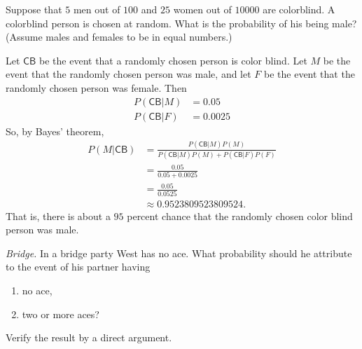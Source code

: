 \begin{problem}[Handout 4, \# 9]
  Suppose that \(5\) men out of \(100\) and \(25\) women out of
  \(\num{10000}\) are colorblind. A colorblind person is chosen at
  random. What is the probability of his being male? (Assume males and
  females to be in equal numbers.)
\end{problem}
\begin{solution}
  Let $\mathsf{\mathsf{CB}}$ be the event that a randomly chosen person is
  color blind. Let $M$ be the event that the randomly chosen person was
  male, and let $F$ be the event that the randomly chosen person was
  female. Then
  \begin{align*}
    P(\mathsf{CB}|M) &= 0.05 \\
    P(\mathsf{CB}|F) &= 0.0025
  \end{align*}
  So, by Bayes' theorem,
  \begin{align*}
    P(M|\mathsf{CB})
    &=\frac{P(\mathsf{CB}|M)P(M)}{P(\mathsf{CB}|M)P(M) + P(\mathsf{CB}|F)P(F)}\\
    &=\frac{0.05}{0.05+0.0025}\\
    &=\frac{0.05}{0.0525}\\
    &\approx\num{0.9523809523809524}.
  \end{align*}
  That is, there is about a \(95\) percent chance that the randomly chosen
  color blind person was male.
\end{solution}
\newpage

\begin{problem}[Handout 4, \# 10]
  \emph{Bridge.} In a bridge party West has no ace. What probability should
  he attribute to the event of his partner having
  \begin{enumerate}[label=(\alph*),noitemsep]
  \item no ace,
  \item two or more aces?
  \end{enumerate}
  Verify the result by a direct argument.
\end{problem}
\begin{solution}

\end{solution}
\newpage

